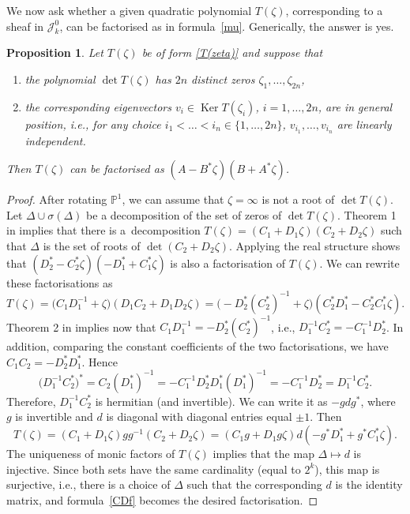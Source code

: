\documentclass[10pt,a4paper]{amsart}
\newcommand{\Ker}{\operatorname{Ker}}
\numberwithin{equation}{section}
\newtheorem{Proposition}[Theorem]{Proposition}
 { \theoremstyle{definition}
\newtheorem{Definition}[Theorem]{Definition}
\newtheorem{Note}[Theorem]{Note}
\newtheorem{Example}[Theorem]{Example}
\newtheorem{Remark}[Theorem]{Remark} }
\newcommand{\oP}{{\mathbb{P}}}
\begin{document}
We now ask whether a given quadratic polynomial $T(\zeta)$, corresponding to a sheaf in $\mathscr{J}_k^0$,
can be factorised as in formula~\eqref{mu}. Generically, the answer is yes.


\begin{Proposition} Let $T(\zeta)$ be of form \eqref{T(zeta)} and suppose that
\begin{enumerate}\itemsep=0pt
\item[$(i)$] the polynomial $\det T(\zeta)$ has $2n$ distinct zeros $\zeta_1,\dots,\zeta_{2n}$,
\item[$(ii)$] the corresponding eigenvectors $v_i\in \Ker T(\zeta_{i})$, $i=1,\dots,2n$, are in general position, i.e., for any choice $i_1<\dots<i_n\in \{1,\dots,2n\}$, $v_{i_1},\dots,v_{i_n}$ are linearly independent.
\end{enumerate}
Then $T(\zeta)$ can be factorised as $(A-B^\ast\zeta)(B+A^\ast\zeta)$.\label{distinct}
\end{Proposition}



\begin{proof}
After rotating $\oP^1$, we can assume that $\zeta=\infty$ is not a root of $\det T(\zeta)$. Let $\Delta\cup \sigma(\Delta)$ be a decomposition of the set of zeros of $\det T(\zeta)$. Theorem 1 in \cite{Mal} implies that there is a~decomposition $T(\zeta)=(C_1+D_1\zeta)(C_2+D_2\zeta)$ such that $\Delta$ is the set of roots of $\det(C_2+D_2\zeta)$. Applying the real structure shows that $(D_2^\ast-C_2^\ast\zeta)(-D_1^\ast+C_1^\ast\zeta)$ is also a factorisation of $T(\zeta)$.
We can rewrite these factorisations as
\[
T(\zeta)=\big(C_1D_1^{-1}+\zeta\big)(D_1C_2+D_1D_2\zeta)=\bigl(-D_2^\ast(C_2^\ast)^{-1}+\zeta\big)(C_2^\ast D_1^\ast-C_2^\ast C_1^\ast\zeta).
\]
Theorem 2 in \cite{Mal} implies now that $C_1D_1^{-1}=-D_2^\ast(C_2^\ast)^{-1}$, i.e., $D_1^{-1}C_2^\ast=-C_1^{-1}D_2^\ast$. In addition, comparing the constant coefficients of the two factorisations, we have $C_1C_2=-D_2^\ast D_1^\ast$. Hence
\[
\big(D_1^{-1}C_2^\ast\big)^\ast=C_2(D_1^\ast)^{-1}=-C_1^{-1}D_2^\ast D_1^\ast(D_1^\ast)^{-1}= -C_1^{-1}D_2^\ast=D_1^{-1}C_2^\ast.
\]
Therefore, $D_1^{-1}C_2^\ast$ is hermitian (and invertible). We can write it as $-gdg^\ast$, where $g$ is invertible and $d$ is diagonal with diagonal entries equal $\pm 1$.
Then
\begin{equation} T(\zeta)=(C_1+D_1\zeta)gg^{-1}(C_2+D_2\zeta)=(C_1g+D_1g\zeta)d(-g^\ast D_1^\ast+g^\ast C_1^\ast\zeta).
\label{CDf}\end{equation}
The uniqueness of monic factors of $T(\zeta)$ implies that the map $\Delta\mapsto d$ is injective. Since both sets have the same cardinality (equal to $2^k$), this map is surjective, i.e., there is a choice of $\Delta$ such that the corresponding $d$ is the identity matrix, and formula~\eqref{CDf} becomes the desired factorisation.
\end{proof}
\end{document}
